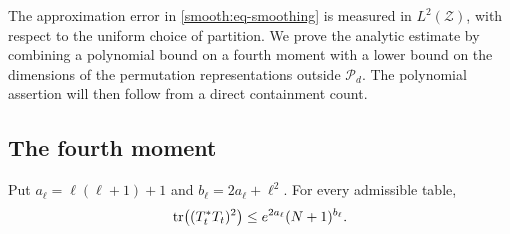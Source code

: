 The approximation error in \eqref{smooth:eq-smoothing} is measured in
\(L^2(\mathcal Z)\), with respect to the uniform choice of partition.
We prove the analytic estimate by combining a polynomial bound on a
fourth moment with a lower bound on the dimensions of the permutation
representations outside \(\mathcal P_d\).  The polynomial assertion will
then follow from a direct containment count.

\subsection{The fourth moment}

\begin{lemma}\label{smooth:lem-fourth-moment}
Put \(a_\ell=\ell(\ell+1)+1\) and
\(b_\ell=2a_\ell+\ell^2\).  For every admissible table,
\begin{equation}\label{smooth:eq-fourth-moment}
  \operatorname{tr}\bigl((T_t^*T_t)^2\bigr)
  \le e^{2a_\ell}(N+1)^{b_\ell}.
\end{equation}
\end{lemma}


